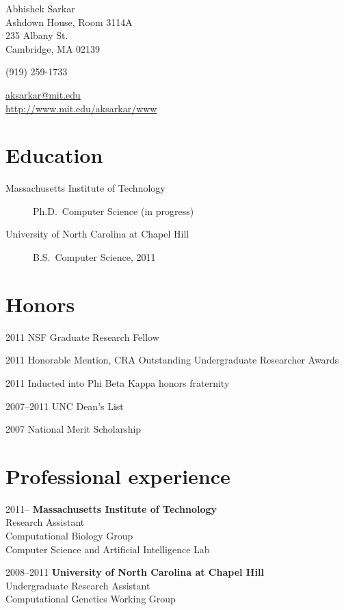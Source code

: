 \documentclass{article}
\begin{document}
{\LARGE Abhishek Sarkar\vspace{1em}}\\
Ashdown House, Room 3114A\\
235 Albany St.\\
Cambridge, MA 02139\vspace{1em}

(919) 259-1733\vspace{1em}

\url{aksarkar@mit.edu}\\
\url{http://www.mit.edu/aksarkar/www}

\section*{Education}
\begin{description}
\item[Massachusetts Institute of Technology] Ph.D.\ Computer Science (in
  progress)
\item[University of North Carolina at Chapel Hill] B.S.\ Computer Science, 2011
\end{description}

\section*{Honors}
\begin{years}
\item[2011] NSF Graduate Research Fellow
\item[2011] Honorable Mention, CRA Outstanding Undergraduate Researcher Awards
\item[2011] Inducted into Phi Beta Kappa honors fraternity
\item[2007--2011] UNC Dean's List
\item[2007] National Merit Scholarship
\end{years}

\section*{Professional experience}
\begin{years}[itemsep=1em]
\item[2011--] \textbf{Massachusetts Institute of Technology}\\
Research Assistant\\
Computational Biology Group\\
Computer Science and Artificial Intelligence Lab

\item[2008--2011] \textbf{University of North Carolina at Chapel Hill}\\
Undergraduate Research Assistant\\
Computational Genetics Working Group
\end{years}
\end{document}
